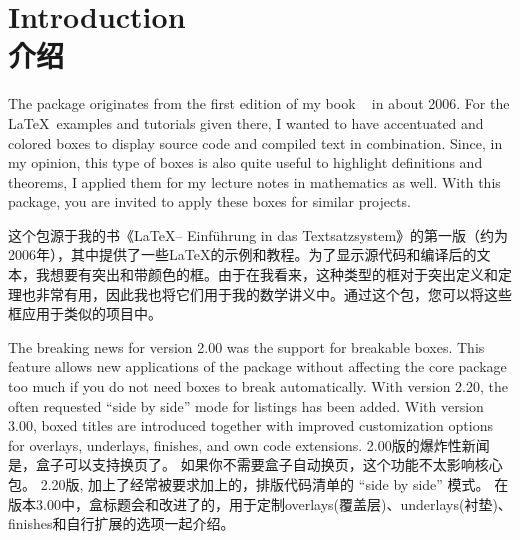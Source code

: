 % 
\section{Introduction\\介绍}%
%

\begin{stripedbox}
The package originates from %
the first edition of my book %
\frqq~%
in about 2006.%
For the \LaTeX\ examples and tutorials given there, %
I wanted to have accentuated and colored boxes to display source code and
compiled text in combination.%
Since, in my opinion, %
this type of boxes is also quite useful to highlight definitions and theorems,%
I applied them for my lecture notes in mathematics %
as well.%
With this package, you are invited to apply these boxes for similar projects.
\tcblower

这个包源于我的书《\LaTeX -- Einführung in das Textsatzsystem》的第一版（约为2006年），其中提供了一些\LaTeX 的示例和教程。为了显示源代码和编译后的文本，我想要有突出和带颜色的框。由于在我看来，这种类型的框对于突出定义和定理也非常有用，因此我也将它们用于我的数学讲义中。通过这个包，您可以将这些框应用于类似的项目中。
\end{stripedbox}




\begin{stripedbox}
The breaking news for version 2.00 was the support for breakable boxes.%
This feature allows new applications of the package without affecting the core package too much if you do not need boxes to break automatically.%
With version 2.20, the often requested \enquote{side by side} mode for listings has been added.%
With version 3.00, boxed titles are introduced together with improved customization options for overlays, underlays, finishes, and own code extensions.%
\tcblower
2.00版的爆炸性新闻是，盒子可以支持换页了。%
如果你不需要盒子自动换页，这个功能不太影响核心包。%
2.20版, 加上了经常被要求加上的，排版代码清单的 \enquote{side by side} 模式。%
在版本3.00中，盒标题会和改进了的，用于定制overlays(覆盖层)、underlays(衬垫)、finishes和自行扩展的选项一起介绍。
\end{stripedbox}

